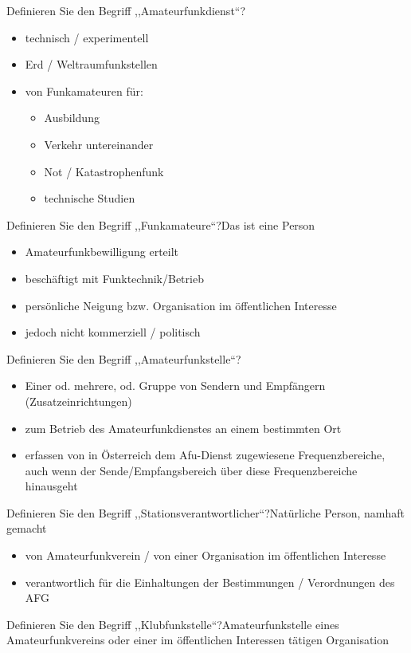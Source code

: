 \documentclass[avery5371,grid,frame,a4paper]{flashcards}
\newcommand{\card}[3]{
  \begin{flashcard}[{\chap} -- #1]{#2}#3\end{flashcard}
}
\begin{document}
\card{18}{Definieren Sie den Begriff ,,Amateurfunkdienst``?}{\begin{itemize}\itemsep0pt \item technisch / experimentell \item	Erd / Weltraumfunkstellen \item	von Funkamateuren für: \begin{itemize}\itemsep0pt \item Ausbildung \item Verkehr untereinander \item Not / Katastrophenfunk \item	technische Studien\end{itemize}\end{itemize}}

\card{19}{Definieren Sie den Begriff ,,Funkamateure``?}{Das ist eine Person\begin{itemize}\itemsep0pt \item Amateurfunkbewilligung erteilt \item	beschäftigt mit Funktechnik/Betrieb \item	persönliche Neigung bzw. Organisation im öffentlichen Interesse \item jedoch nicht kommerziell / politisch\end{itemize}}

\card{20}{Definieren Sie den Begriff ,,Amateurfunkstelle``?}{\begin{itemize}\itemsep1pt \item Einer od. mehrere, od. Gruppe von Sendern und Empfängern (Zusatzeinrichtungen) \item	zum Betrieb des Amateurfunkdienstes an einem bestimmten Ort \item	erfassen von in Österreich dem Afu-Dienst zugewiesene Frequenzbereiche, auch wenn	der Sende/Empfangsbereich über diese	Frequenzbereiche hinausgeht\end{itemize}}

\card{21}{Definieren Sie den Begriff ,,Stationsverantwortlicher``?}{Natürliche Person, namhaft gemacht \begin{itemize}\itemsep1pt \item von Amateurfunkverein / von einer Organisation im öffentlichen Interesse \item verantwortlich für die Einhaltungen der Bestimmungen / Verordnungen des AFG\end{itemize}}

\card{22}{Definieren Sie den Begriff ,,Klubfunkstelle``?}{Amateurfunkstelle eines Amateurfunkvereins oder einer im öffentlichen Interessen tätigen Organisation}
\end{document}
